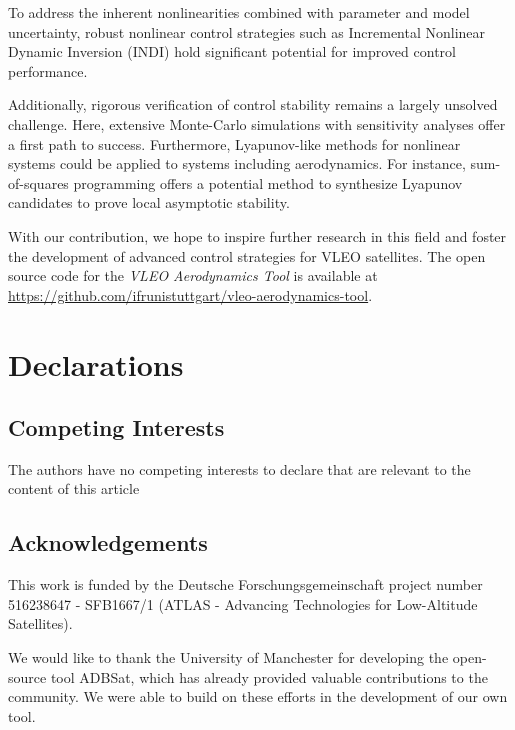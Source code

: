 \documentclass[pdflatex,sn-mathphys-num]{sn-jnl}%
\theoremstyle{thmstyleone}%
\theoremstyle{thmstyletwo}%
\theoremstyle{thmstylethree}%
\begin{document}
	To address the inherent nonlinearities combined with parameter and model uncertainty, robust nonlinear control strategies such as Incremental Nonlinear Dynamic Inversion (INDI) hold significant potential for improved control performance. 

	Additionally, rigorous verification of control stability remains a largely unsolved challenge. Here, extensive Monte-Carlo simulations with sensitivity analyses offer a first path to success. Furthermore, Lyapunov-like methods for nonlinear systems could be applied to systems including aerodynamics. For instance, sum-of-squares programming offers a potential method to synthesize Lyapunov candidates to prove local asymptotic stability.

	With our contribution, we hope to inspire further research in this field and foster the development of advanced control strategies for VLEO satellites.
	The open source code for the \textit{VLEO Aerodynamics Tool} is available at \url{https://github.com/ifrunistuttgart/vleo-aerodynamics-tool}.

    \section{Declarations}
    \subsection{Competing Interests}
    The authors have no competing interests to declare that are relevant to the content of this article
	\subsection*{Acknowledgements}
	This work is funded by the Deutsche Forschungsgemeinschaft project number 516238647 - SFB1667/1 (ATLAS - Advancing Technologies for Low-Altitude Satellites). 
	
	We would like to thank the University of Manchester for developing the open-source tool ADBSat, which has already provided valuable contributions to the community. We were able to build on these efforts in the development of our own tool.



    





\end{document}
